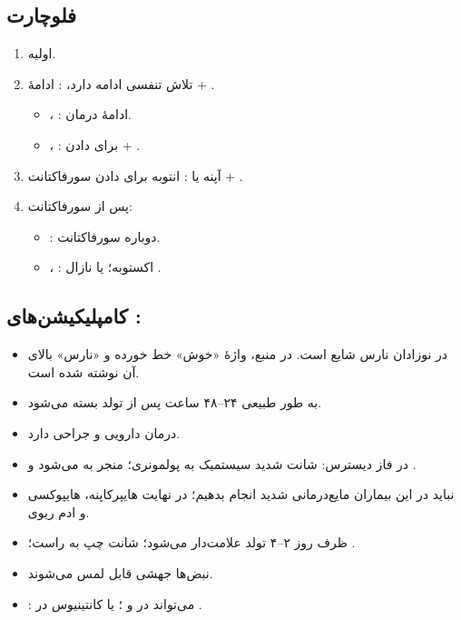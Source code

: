 \documentclass[12pt,a4paper]{article}
\begin{document}
\subsection*{فلوچارت }
\begin{enumerate}
\item {} اولیه.
\item تلاش تنفسی ادامه دارد، : ادامهٔ  + .
\begin{itemize}
\item {}، : ادامهٔ درمان.
\item {}، :  برای دادن  + .
\end{itemize}
\item آپنه یا : انتوبه برای دادن سورفاکتانت + .
\item پس از سورفاکتانت:
\begin{itemize}
\item {}: دوباره سورفاکتانت.
\item {}، : اکستوبه؛  یا نازال .
\end{itemize}
\end{enumerate}
\subsection*{کامپلیکیشن‌های : }
\begin{itemize}
\item در نوزادان نارس شایع است. در منبع، واژهٔ «خوش» خط خورده و «نارس» بالای آن نوشته شده است.
\item به طور طبیعی ۲۴–۴۸ ساعت پس از تولد بسته می‌شود.
\item درمان دارویی و جراحی دارد.
\item {} در فاز دیسترس: شانت شدید سیستمیک به پولمونری؛ منجر به  می‌شود و .
\item نباید در این بیماران مایع‌درمانی شدید انجام بدهیم؛ در نهایت هایپرکاپنه، هایپوکسی و ادم ریوی.
\item {} ظرف روز ۲–۴ تولد علامت‌دار می‌شود؛ شانت چپ به راست؛ .
\item نبض‌ها جهشی قابل لمس می‌شوند.
\item {}: می‌تواند  در  و ؛ یا کانتینیوس در  .
\end{itemize}
\end{document}
